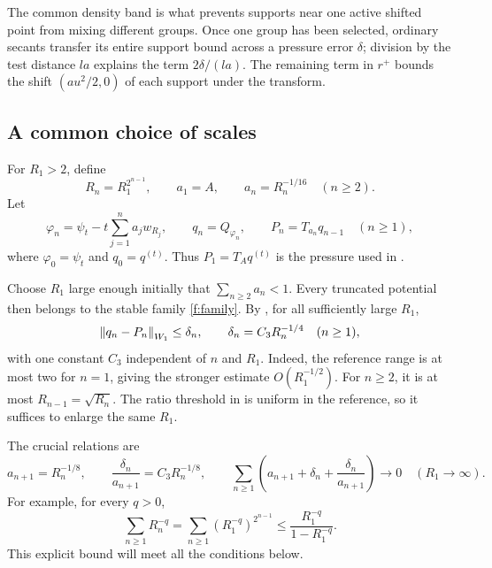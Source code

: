 The common density band is what prevents supports near one active
shifted point from mixing different groups.  Once one group has been
selected, ordinary secants transfer its entire support bound across a
pressure error \(\delta\); division by the test distance \(la\)
explains the term \(2\delta/(la)\).  The remaining term in \(r^+\)
bounds the shift \((au^2/2,0)\) of each support under the transform.

\subsection{A common choice of scales}\label{m:schedule}

For \(R_1>2\), define
\begin{equation}\label{eq:mass-range}
 R_n=R_1^{2^{n-1}},\qquad
 a_1=A,\qquad a_n=R_n^{-1/16}\quad(n\ge2).
\end{equation}
Let
\begin{equation}\label{eq:truncated-models}
 \varphi_n=\psi_t-t\sum_{j=1}^n a_jw_{R_j},
 \qquad q_n=Q_{\varphi_n},
 \qquad P_n=T_{a_n}q_{n-1}\quad(n\ge1),
\end{equation}
where \(\varphi_0=\psi_t\) and \(q_0=q^{(t)}\).
Thus \(P_1=T_Aq^{(t)}\) is the pressure used in
.

Choose \(R_1\) large enough initially that
\(\sum_{n\ge2}a_n<1\).
Every truncated potential then belongs to the stable family
\eqref{f:family}.
By , for all sufficiently large \(R_1\),
\begin{equation}\label{eq:approximation-errors}
 \left\lVert q_n-P_n\right\rVert_{W_1}\le\delta_n,
 \qquad \delta_n=C_3R_n^{-1/4}\quad(n\ge1),
\end{equation}
with one constant \(C_3\) independent of \(n\) and \(R_1\).
Indeed, the reference range is at most two for \(n=1\), giving the
stronger estimate \(O(R_1^{-1/2})\).
For \(n\ge2\), it is at most \(R_{n-1}=\sqrt{R_n}\).
The ratio threshold in  is uniform in the reference, so it
suffices to enlarge the same \(R_1\).

The crucial relations are
\begin{equation}\label{eq:summable-errors}
 a_{n+1}=R_n^{-1/8},\qquad
 \frac{\delta_n}{a_{n+1}}=C_3R_n^{-1/8},
 \qquad
 \sum_{n\ge1}\left(a_{n+1}+\delta_n+
             \frac{\delta_n}{a_{n+1}}\right)
       \longrightarrow0\quad(R_1\to\infty).
\end{equation}
For example, for every \(q>0\),
\[
 \sum_{n\ge1}R_n^{-q}
 =\sum_{n\ge1}(R_1^{-q})^{2^{n-1}}
 \le \frac{R_1^{-q}}{1-R_1^{-q}}.
\]
This explicit bound will meet all the conditions below.

